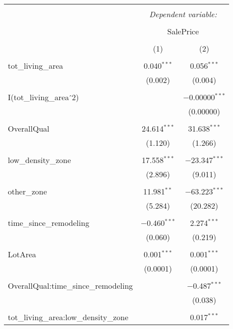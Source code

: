 \documentclass{article}
\begin{document}
\begin{table}[!htbp] \centering 
  \caption{} 
  \label{} 
\begin{tabular}{@{\extracolsep{5pt}}lcc} 
\\[-1.8ex]\hline 
\hline \\[-1.8ex] 
 & \multicolumn{2}{c}{\textit{Dependent variable:}} \\ 
\cline{2-3} 
\\[-1.8ex] & \multicolumn{2}{c}{SalePrice} \\ 
\\[-1.8ex] & (1) & (2)\\ 
\hline \\[-1.8ex] 
 tot\_living\_area & 0.040$^{***}$ & 0.056$^{***}$ \\ 
  & (0.002) & (0.004) \\ 
  & & \\ 
 I(tot\_living\_area$\hat{\mkern6mu}$2) &  & $-$0.00000$^{***}$ \\ 
  &  & (0.00000) \\ 
  & & \\ 
 OverallQual & 24.614$^{***}$ & 31.638$^{***}$ \\ 
  & (1.120) & (1.266) \\ 
  & & \\ 
 low\_density\_zone & 17.558$^{***}$ & $-$23.347$^{***}$ \\ 
  & (2.896) & (9.011) \\ 
  & & \\ 
 other\_zone & 11.981$^{**}$ & $-$63.223$^{***}$ \\ 
  & (5.284) & (20.282) \\ 
  & & \\ 
 time\_since\_remodeling & $-$0.460$^{***}$ & 2.274$^{***}$ \\ 
  & (0.060) & (0.219) \\ 
  & & \\ 
 LotArea & 0.001$^{***}$ & 0.001$^{***}$ \\ 
  & (0.0001) & (0.0001) \\ 
  & & \\ 
 OverallQual:time\_since\_remodeling &  & $-$0.487$^{***}$ \\ 
  &  & (0.038) \\ 
  & & \\ 
 tot\_living\_area:low\_density\_zone &  & 0.017$^{***}$ \\ 

\end{tabular}
\end{table}
\end{document}
